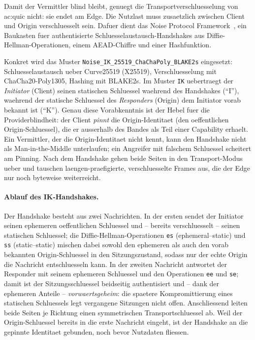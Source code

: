 Damit der Vermittler blind bleibt, genuegt die Transportverschluesselung von
\gls{ac:quic} nicht: sie endet am Edge. Die Nutzlast muss zusaetzlich zwischen
Client und Origin verschluesselt sein. Dafuer dient das Noise Protocol
Framework~\cite{perrin2018noise}, ein Baukasten fuer authentisierte
Schluesselaustausch-Handshakes aus Diffie-Hellman-Operationen, einem
AEAD-Chiffre und einer Hashfunktion.

Konkret wird das Muster \texttt{Noise\_IK\_25519\_ChaChaPoly\_BLAKE2s}
eingesetzt: Schluesselaustausch ueber Curve25519 (X25519), Verschluesselung mit
ChaCha20-Poly1305, Hashing mit BLAKE2s. Im Muster \texttt{IK} uebertraegt der
\emph{Initiator} (Client) seinen statischen Schluessel waehrend des Handshakes
(\enquote{I}), waehrend der statische Schluessel des \emph{Responders} (Origin)
dem Initiator vorab bekannt ist (\enquote{K}). Genau diese Vorabkenntnis ist der
Hebel fuer die Providerblindheit: der Client \emph{pinnt} die Origin-Identitaet
(den oeffentlichen Origin-Schluessel), die er ausserhalb des Bandes als Teil
einer Capability erhaelt. Ein Vermittler, der die Origin-Identitaet nicht kennt,
kann den Handshake nicht als Man-in-the-Middle unterlaufen; ein Angreifer mit
falschem Schluessel scheitert am Pinning. Nach dem Handshake gehen beide Seiten
in den Transport-Modus ueber und tauschen laengen-praefigierte, verschluesselte
Frames aus, die der Edge nur noch byteweise weiterreicht.

\paragraph{Ablauf des IK-Handshakes.} Der Handshake besteht aus zwei Nachrichten.
In der ersten sendet der Initiator seinen ephemeren oeffentlichen Schluessel und
-- bereits verschluesselt -- seinen statischen Schluessel; die
Diffie-Hellman-Operationen \texttt{es} (ephemeral--static) und \texttt{ss}
(static--static) mischen dabei sowohl den ephemeren als auch den vorab bekannten
Origin-Schluessel in den Sitzungszustand, sodass nur der echte Origin die
Nachricht entschluesseln kann. In der zweiten Nachricht antwortet der Responder
mit seinem ephemeren Schluessel und den Operationen \texttt{ee} und \texttt{se};
damit ist der Sitzungsschluessel beidseitig authentisiert und -- dank der
ephemeren Anteile -- \emph{vorwaertsgeheim}: die spaetere Kompromittierung eines
statischen Schluessels legt vergangene Sitzungen nicht offen. Anschliessend leiten
beide Seiten je Richtung einen symmetrischen Transportschluessel ab. Weil der
Origin-Schluessel bereits in die erste Nachricht eingeht, ist der Handshake an die
gepinnte Identitaet gebunden, noch bevor Nutzdaten fliessen.

